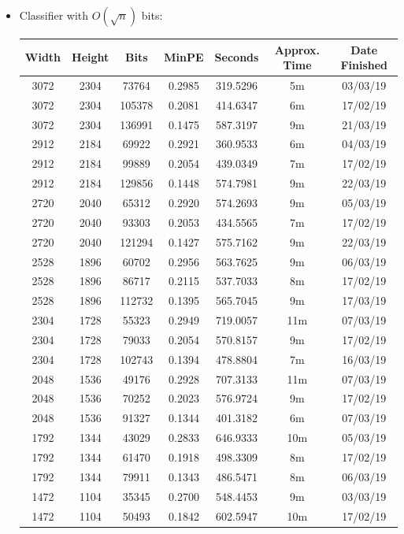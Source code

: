 \documentclass[11pt,a4paper]{report}
\begin{document}
\begin{itemize}
\newpage
\item Classifier with $O(\sqrt{n})$ bits:
  \begin{center}
  \begin{tabular}{ c c c | c | c c c }
  Width & Height & Bits & MinPE & Seconds & Approx. Time & Date Finished \\ \hline
  3072 & 2304 & 73764 & 0.2985 & 319.5296 & 5m & 03/03/19 \\
  3072 & 2304 & 105378 & 0.2081 & 414.6347 & 6m & 17/02/19 \\
  3072 & 2304 & 136991 & 0.1475 & 587.3197 & 9m & 21/03/19 \\
  2912 & 2184 & 69922 & 0.2921 & 360.9533 & 6m & 04/03/19 \\
  2912 & 2184 & 99889 & 0.2054 & 439.0349 & 7m & 17/02/19 \\
  2912 & 2184 & 129856 & 0.1448 & 574.7981 & 9m & 22/03/19 \\
  2720 & 2040 & 65312 & 0.2920 & 574.2693 & 9m & 05/03/19 \\
  2720 & 2040 & 93303 & 0.2053 & 434.5565 & 7m & 17/02/19 \\
  2720 & 2040 & 121294 & 0.1427 & 575.7162 & 9m & 22/03/19 \\
  2528 & 1896 & 60702 & 0.2956 & 563.7625 & 9m & 06/03/19 \\
  2528 & 1896 & 86717 & 0.2115 & 537.7033 & 8m & 17/02/19 \\
  2528 & 1896 & 112732 & 0.1395 & 565.7045 & 9m & 17/03/19 \\
  2304 & 1728 & 55323 & 0.2949 & 719.0057 & 11m & 07/03/19 \\
  2304 & 1728 & 79033 & 0.2054 & 570.8157 & 9m & 17/02/19 \\
  2304 & 1728 & 102743 & 0.1394 & 478.8804 & 7m & 16/03/19 \\
  2048 & 1536 & 49176 & 0.2928 & 707.3133 & 11m & 07/03/19 \\
  2048 & 1536 & 70252 & 0.2023 & 576.9724 & 9m & 17/02/19 \\
  2048 & 1536 & 91327 & 0.1344 & 401.3182 & 6m & 07/03/19 \\
  1792 & 1344 & 43029 & 0.2833 & 646.9333 & 10m & 05/03/19 \\
  1792 & 1344 & 61470 & 0.1918 & 498.3309 & 8m & 17/02/19 \\
  1792 & 1344 & 79911 & 0.1343 & 486.5471 & 8m & 06/03/19 \\
  1472 & 1104 & 35345 & 0.2700 & 548.4453 & 9m & 03/03/19 \\
  1472 & 1104 & 50493 & 0.1842 & 602.5947 & 10m & 17/02/19 \\

\end{tabular}
\end{center}
\end{itemize}
\end{document}
